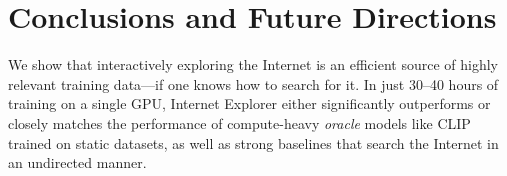 \chapter{Conclusions and Future Directions}
\label{sec:conclusions}


We show that interactively exploring the Internet is an efficient source of highly relevant training data---if one knows how to search for it. In just 30--40 hours of training on a single GPU, Internet Explorer either significantly outperforms or closely matches the performance of compute-heavy \textit{oracle} models like CLIP~\cite{radford2021learning} trained on static datasets, as well as strong baselines that search the Internet in an undirected manner.



